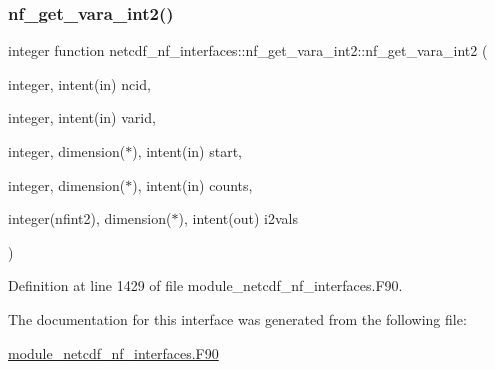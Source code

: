 \subsubsection{\texorpdfstring{nf\+\_\+get\+\_\+vara\+\_\+int2()}{nf\_get\_vara\_int2()}}
{\footnotesize\ttfamily integer function netcdf\+\_\+nf\+\_\+interfaces\+::nf\+\_\+get\+\_\+vara\+\_\+int2\+::nf\+\_\+get\+\_\+vara\+\_\+int2 (\begin{DoxyParamCaption}\item[{integer, intent(in)}]{ncid,  }\item[{integer, intent(in)}]{varid,  }\item[{integer, dimension($\ast$), intent(in)}]{start,  }\item[{integer, dimension($\ast$), intent(in)}]{counts,  }\item[{integer(nfint2), dimension($\ast$), intent(out)}]{i2vals }\end{DoxyParamCaption})}



Definition at line 1429 of file module\+\_\+netcdf\+\_\+nf\+\_\+interfaces.\+F90.



The documentation for this interface was generated from the following file\+:\begin{DoxyCompactItemize}
\item 
\hyperlink{module__netcdf__nf__interfaces_8F90}{module\+\_\+netcdf\+\_\+nf\+\_\+interfaces.\+F90}\end{DoxyCompactItemize}
